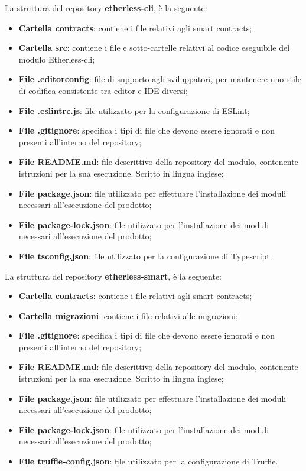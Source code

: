 			La struttura del repository \textbf{etherless-cli}, è la seguente:
			\begin{itemize}
				\item \textbf{Cartella contracts}: contiene i file relativi agli smart contracts;
				\item \textbf{Cartella src}: contiene i file e sotto-cartelle relativi al codice eseguibile del modulo Etherless-cli;
				\item \textbf{File .editorconfig}: file di supporto agli sviluppatori, per mantenere uno stile di codifica consistente tra editor e IDE diversi;
				\item \textbf{File .eslintrc.js}: file utilizzato per la configurazione di ESLint;
				\item \textbf{File .gitignore}: specifica i tipi di file che devono essere ignorati e non presenti all'interno del repository;
				\item \textbf{File README.md}: file descrittivo della repository del modulo, contenente istruzioni per la sua esecuzione. Scritto in lingua inglese;
				\item \textbf{File package.json}: file utilizzato per effettuare l'installazione dei moduli necessari all'esecuzione del prodotto;
				\item \textbf{File package-lock.json}: file utilizzato per l'installazione dei moduli necessari all'esecuzione del prodotto;
				\item \textbf{File tsconfig.json}: file utilizzato per la configurazione di Typescript.
			\end{itemize}
			La struttura del repository \textbf{etherless-smart}, è la seguente:
			\begin{itemize}
				\item \textbf{Cartella contracts}: contiene i file relativi agli smart contracts;
				\item \textbf{Cartella migrazioni}: contiene i file relativi alle migrazioni;
				\item \textbf{File .gitignore}: specifica i tipi di file che devono essere ignorati e non presenti all'interno del repository;
				\item \textbf{File README.md}: file descrittivo della repository del modulo, contenente istruzioni per la sua esecuzione. Scritto in lingua inglese;
				\item \textbf{File package.json}: file utilizzato per effettuare l'installazione dei moduli necessari all'esecuzione del prodotto;
				\item \textbf{File package-lock.json}: file utilizzato per l'installazione dei moduli necessari all'esecuzione del prodotto;
				\item \textbf{File truffle-config.json}: file utilizzato per la configurazione di Truffle.
			\end{itemize}
